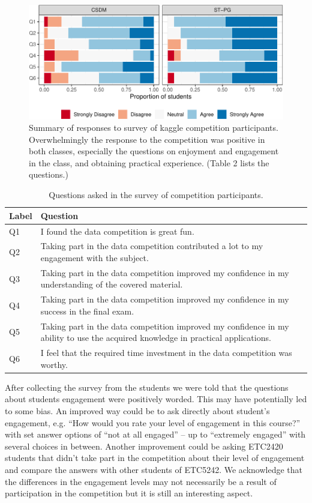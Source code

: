 \documentclass[12pt]{article}
\begin{document}
\begin{figure}
\centering
\includegraphics{paper-kaggle_files/figure-latex/likert-1.pdf}
\caption{\label{fig:likert}Summary of responses to survey of kaggle
competition participants. Overwhelmingly the response to the competition
was positive in both classes, especially the questions on enjoyment and
engagement in the class, and obtaining practical experience. (Table 2
lists the questions.)}
\end{figure}

\begin{table}[b!]
\begin{center}
\begin{tabular}{|l|p{15cm}|}\hline
Label & Question \\\hline
Q1 & I found the data competition is great fun.\\\hline
Q2 & Taking part in the data competition contributed a lot to my engagement with the subject.\\\hline
Q3 & Taking part in the data competition improved my confidence in my understanding of the covered material.\\\hline
Q4 & Taking part in the data competition improved my confidence in my success in the final exam.\\\hline
Q5 & Taking part in the data competition improved my confidence in my ability to use the acquired knowledge in practical applications.\\\hline
Q6 & I feel that the required time investment in the data competition was worthy. \\\hline
\end{tabular}
\end{center}
\caption{Questions asked in the survey of competition participants.}
\label{survey_Q}
\end{table}

After collecting the survey from the students we were told that the
questions about students engagement were positively worded. This may
have potentially led to some bias. An improved way could be to ask
directly about student's engagement, e.g. ``How would you rate your
level of engagement in this course?'' with set answer options of ``not
at all engaged'' -- up to ``extremely engaged'' with several choices in
between. Another improvement could be asking ETC2420 students that
didn't take part in the competition about their level of engagement and
compare the answers with other students of ETC5242. We acknowledge that
the differences in the engagement levels may not necessarily be a result
of participation in the competition but it is still an interesting
aspect.
\end{document}
